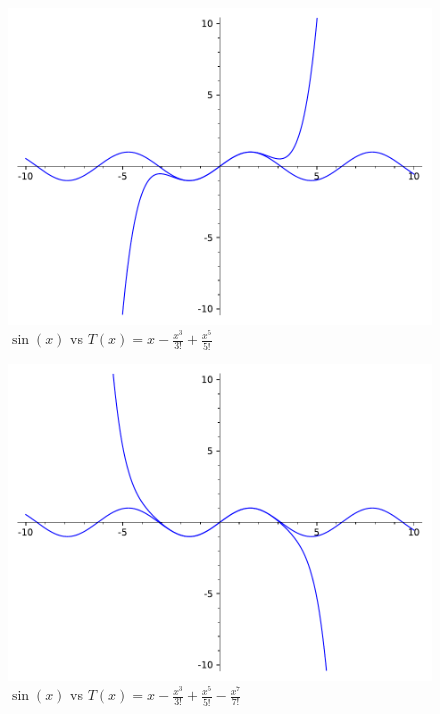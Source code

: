 \begin{enumerate}
{\begin{figure}[H]
				\label{fig:taylor_3_sin}
			\end{figure}
			\begin{figure}[H]
				\centering
				\includegraphics{cviceni_8/fig/taylor_sin_5.pdf}
				\caption{$\sin(x)$ vs $T(x) = x - \frac{x^3}{3!} + \frac{x^5}{5!}$}
				\label{fig:taylor_5_sin}
			\end{figure}
			\begin{figure}[H]
				\centering
				\includegraphics{cviceni_8/fig/taylor_sin_7.pdf}
				\caption{$\sin(x)$ vs $T(x) = x - \frac{x^3}{3!} + \frac{x^5}{5!} - \frac{x^7}{7!}$}
				\label{fig:taylor_7_sin}
			\end{figure}
			\begin{figure}[H]
				\centering

\end{figure}}
\end{enumerate}

